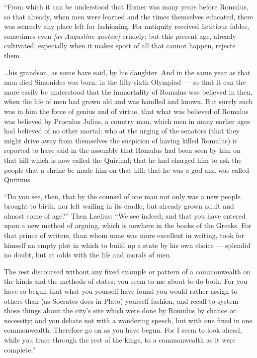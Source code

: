  ``From which it can be understood that Homer was many years before Romulus, so that already, when men were learned and the times themselves educated, there was scarcely any place left for fashioning. For antiquity received fictitious fables, sometimes even \textit{[as Augustine quotes:]} crudely; but this present age, already cultivated, especially when it makes sport of all that cannot happen, rejects them.

 \ldots his grandson, as some have said, by his daughter. And in the same year as that man died Simonides was born, in the fifty-sixth Olympiad --- so that it can the more easily be understood that the immortality of Romulus was believed in then, when the life of men had grown old and was handled and known. But surely such was in him the force of genius and of virtue, that what was believed of Romulus was believed by Proculus Julius, a country man, which men in many earlier ages had believed of no other mortal: who at the urging of the senators (that they might drive away from themselves the suspicion of having killed Romulus) is reported to have said in the assembly that Romulus had been seen by him on that hill which is now called the Quirinal; that he had charged him to ask the people that a shrine be made him on that hill; that he was a god and was called Quirinus.

 ``Do you see, then, that by the counsel of one man not only was a new people brought to birth, nor left wailing in its cradle, but already grown adult and almost come of age?'' Then Laelius: ``We see indeed; and that you have entered upon a new method of arguing, which is nowhere in the books of the Greeks. For that prince of writers, than whom none was more excellent in writing, took for himself an empty plot in which to build up a state by his own choice --- splendid no doubt, but at odds with the life and morals of men.

 The rest discoursed without any fixed example or pattern of a commonwealth on the kinds and the methods of states; you seem to me about to do both. For you have so begun that what you yourself have found you would rather assign to others than (as Socrates does in Plato) yourself fashion, and recall to system those things about the city's site which were done by Romulus by chance or necessity; and you debate not with a wandering speech, but with one fixed in one commonwealth. Therefore go on as you have begun. For I seem to look ahead, while you trace through the rest of the kings, to a commonwealth as it were complete.''

